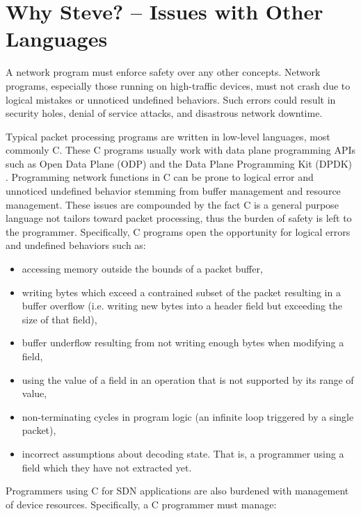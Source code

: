 \section{Why Steve? -- Issues with Other Languages}

A network program must enforce safety over any other concepts.
Network programs, especially those running on high-traffic devices, must not
crash due to logical mistakes or unnoticed undefined behaviors.
Such errors could result in security holes, denial of service attacks, and
disastrous network downtime.

Typical packet processing programs are written in low-level languages, most
commonly C. These C programs usually work with data plane programming APIs such
as Open Data Plane (ODP) \cite{odp_webpage} and the Data Plane Programming Kit
(DPDK) \cite{dpdk_webpage}. Programming network functions in C can be prone
to logical error and unnoticed undefined behavior stemming from buffer management
and resource management. These issues are compounded by the fact C is a general
purpose language not tailors toward packet processing, thus the burden of safety
is left to the programmer.
Specifically, C programs open the opportunity for logical errors and undefined
behaviors such as:

\begin{itemize}
\item accessing memory outside the bounds of a packet buffer,

\item writing bytes which exceed a contrained subset of the packet
resulting in a buffer overflow (i.e. writing new bytes into a header field
but exceeding the size of that field),

\item buffer underflow resulting from not writing enough bytes when modifying
a field,

\item using the value of a field in an operation that is not supported by its
range of value,

\item non-terminating cycles in program logic (an infinite loop
triggered by a single packet),

\item incorrect assumptions about decoding state. That is, a programmer using
a field which they have not extracted yet.
\end{itemize}

Programmers using C for SDN applications are also burdened with management of
device resources. Specifically, a C programmer must manage:

